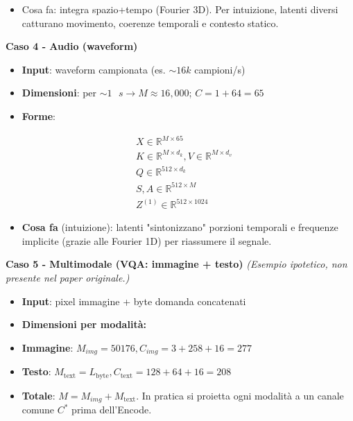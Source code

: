 \documentclass[
  11pt,
]{article}
\begin{document}
\begin{itemize}
\item
  Cosa fa: integra spazio+tempo (Fourier 3D). Per intuizione, latenti diversi catturano
  movimento, coerenze temporali e contesto statico.
\end{itemize}

\textbf{Caso 4 - Audio (waveform)}

\begin{itemize}
\item
  \textbf{Input}: waveform campionata (es. \(\sim 16k\) campioni/s)
\item
  \textbf{Dimensioni}: per
  \(\sim 1\text{ }s \rightarrow M \approx 16,000\); \(C = 1 + 64 = 65\)
\item
  \textbf{Forme}:
\end{itemize}

\[\begin{matrix}
 & X \in \mathbb{R}^{M \times 65} \\
 & K \in \mathbb{R}^{M \times d_{k}},V \in \mathbb{R}^{M \times d_{v}} \\
 & Q \in \mathbb{R}^{512 \times d_{k}} \\
 & S,A \in \mathbb{R}^{512 \times M} \\
 & Z^{(1)} \in \mathbb{R}^{512 \times 1024}
\end{matrix}\]

\begin{itemize}
\item
  \textbf{Cosa fa} (intuizione): latenti "sintonizzano" porzioni temporali e
  frequenze implicite (grazie alle Fourier 1D) per riassumere il
  segnale.
\end{itemize}

\textbf{Caso 5 - Multimodale (VQA: immagine + testo)}
\emph{(Esempio ipotetico, non presente nel paper originale.)}

\begin{itemize}
\item
  \textbf{Input}: pixel immagine + byte domanda concatenati
\item
  \textbf{Dimensioni per modalità:}
\end{itemize}

\begin{itemize}
\item
  \textbf{Immagine}: \(M_{img} = 50176,C_{img} = 3 + 258 + 16 = 277\)
\item
  \textbf{Testo}:
  \(M_{\text{text}} = L_{\text{byte}},C_{\text{text}} = 128 + 64 + 16 = 208\)
\item
  \textbf{Totale}: \(M = M_{img} + M_{\text{text}}\). In pratica si
  proietta ogni modalità a un canale comune \(C^{*}\) prima
  dell'Encode.
\end{itemize}
\end{document}
